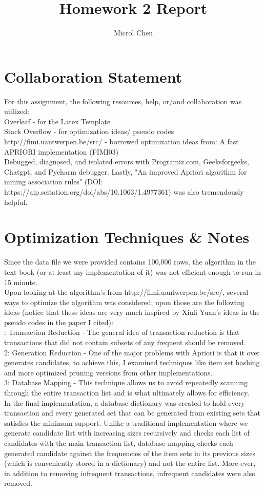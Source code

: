\documentclass{article}
\title{Homework 2 Report}
\author{Microl Chen}
\begin{document}
\maketitle

\section{Collaboration Statement}
For this assignment, the following resources, help, or/and collaboration was utilized:
\\Overleaf - for the Latex Template
\\Stack Overflow - for optimization ideas/ pseudo codes
\\http://fimi.uantwerpen.be/src/ - borrowed optimization ideas from: A fast APRIORI implementation (FIMI03)
\\Debugged, diagnosed, and isolated errors with Programiz.com, Geeksforgeeks, Chatgpt, and Pycharm debugger. Lastly, "An improved Apriori algorithm for mining association rules" (DOI: https://aip.scitation.org/doi/abs/10.1063/1.4977361) was also tremendously helpful.


\section{Optimization Techniques \& Notes}
Since the data file we were provided contains 100,000 rows, the algorithm in the text book (or at least my implementation of it) was not efficient enough to run in 15 minute. \\

\noindent
Upon looking at the algorithm's from http://fimi.uantwerpen.be/src/, several ways to optimize the algorithm was considered; upon those are the following ideas (notice that these ideas are very much inspired by Xiuli Yuan's ideas in the pseudo codes in the paper I cited): \\

: Transaction Reduction - The general idea of transaction reduction is that transactions that did not contain subsets of any frequent should be removed.\\
2: Generation Reduction - One of the major problems with Apriori is that it over generates candidates, to achieve this, I examined techniques like item set hashing and more optimized pruning versions from other implementations. \\
3: Database Mapping - This technique allows us to avoid repeatedly scanning through the entire transaction list and is what ultimately allows for efficiency.\\

\noindent
In the final implementation, a database dictionary was created to hold every transaction and every generated set that can be generated from existing sets that satisfies the minimum support. Unlike a traditional implementation where we generate candidate list with increasing sizes recursively and checks each list of candidates with the main transaction list, database mapping checks each generated candidate against the frequencies of the item sets in its previous sizes (which is conveniently stored in a dictionary) and not the entire  list. More-ever, in addition to removing infrequent transactions, infrequent candidates were also removed.
\end{document}
